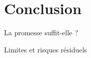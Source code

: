 \section{Conclusion}

\begin{frame}{La promesse suffit-elle ?}
\end{frame}

\begin{frame}{Limites et risques résiduels}
\end{frame}


